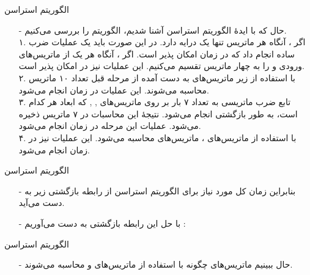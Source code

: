 \begin{frame}{‌الگوریتم استراسن}
\begin{itemize}\itemr
\item[-]
حال که با ایدهٔ الگوریتم استراسن آشنا شدیم، الگوریتم را بررسی می‌کنیم.\\
۱. اگر
، آنگاه هر ماتریس تنها یک درایه دارد. در این صورت باید یک عملیات ضرب ساده انجام داد که در زمان
امکان پذیر است. اگر
، آنگاه هر یک از ماتریس‌های ورودی
و
 را به چهار ماتریس
تقسیم می‌کنیم. این عملیات نیز در
امکان پذیر است.\\
۲. با استفاده از زیر ماتریس‌های به دست آمده از مرحله قبل تعداد ۱۰ ماتریس
محاسبه می‌شوند. این عملیات در زمان
انجام می‌شود.\\
۳. تابع ضرب ماتریسی به تعداد ۷ بار بر روی ماتریس‌های
, , 
که ابعاد هر کدام 
است، به طور بازگشتی انجام می‌شود. نتیجهٔ این محاسبات در ۷ ماتریس
ذخیره می‌شود.
عملیات این مرحله در زمان
انجام می‌شود.\\
۴. با استفاده از ماتریس‌های
، ماتریس‌های
محاسبه می‌شود. این عملیات نیز در زمان
انجام می‌شود.
\end{itemize}
\end{frame}


\begin{frame}{‌الگوریتم استراسن}
\begin{itemize}\itemr
\item[-]
بنابراین  زمان کل مورد نیاز برای الگوریتم استراسن از رابطه بازگشتی زیر به دست می‌آید.
\begin{flushleft}
\end{flushleft}
\item[-]
با حل این رابطه بازگشتی به دست می‌آوریم :
\begin{flushleft}
\end{flushleft}
\end{itemize}
\end{frame}


\begin{frame}{‌الگوریتم استراسن}
\begin{itemize}\itemr
\item[-]
حال ببینیم ماتریس‌های
چگونه با استفاده از ماتریس‌های
و
محاسبه می‌شوند.
\end{itemize}
\end{frame}


